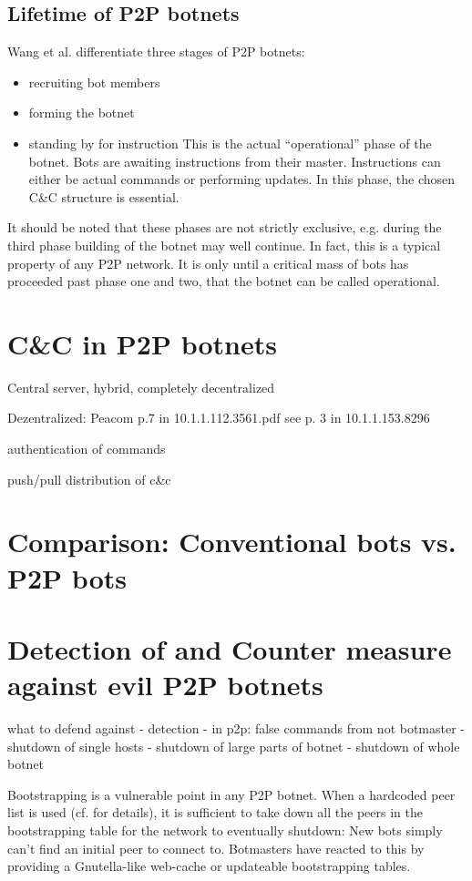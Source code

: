 \documentclass{llncs}
\begin{document}
\cite{wang2009systematic}

\subsection{Lifetime of P2P botnets}
Wang et al.\cite{wang2009systematic} differentiate three stages of P2P botnets:
\begin{itemize}
\item recruiting bot members
\item forming the botnet
\item standing by for instruction
This is the actual ``operational'' phase of the botnet. Bots are awaiting instructions from their master. Instructions can either be actual commands or performing updates. In this phase, the chosen C\&C structure is essential.
\end{itemize}
It should be noted that these phases are not strictly exclusive,
e.g. during the third phase building of the botnet may well
continue. In fact, this is a typical property of any P2P network. It
is only until a critical mass of bots has proceeded past phase one and
two, that the botnet can be called operational.

\section{C\&C in P2P botnets}
Central server, hybrid, completely decentralized

Dezentralized: Peacom p.7 in 10.1.1.112.3561.pdf
see p. 3 in 10.1.1.153.8296

authentication of commands

push/pull distribution of c\&c

\section{Comparison: Conventional bots vs. P2P bots}

\section{Detection of and Counter measure against evil P2P botnets}
\label{counter-measure}
what to defend against
- detection
- in p2p: false commands from not botmaster
- shutdown of single hosts
- shutdown of large parts of botnet
- shutdown of whole botnet

Bootstrapping is a vulnerable point in any P2P botnet. When a hardcoded peer list is used (cf. for details), it is sufficient to take down all the peers in the bootstrapping table for the network to eventually shutdown: New bots simply can't find an initial peer to connect to. Botmasters have reacted to this by providing a Gnutella-like web-cache or updateable bootstrapping tables.



\end{document}
